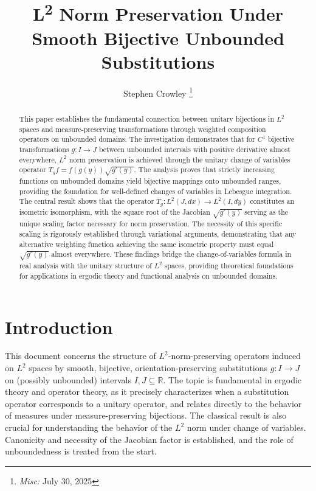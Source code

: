 \documentclass{article}
\newcommand{\tmmisc}[1]{\thanks{\textit{Misc:} #1}}
\newcommand{\tmrsup}[1]{\textsuperscript{#1}}
\begin{document}
\title{L\tmrsup{2} Norm Preservation Under Smooth Bijective Unbounded
Substitutions}

\author{
  Stephen Crowley
  \tmmisc{July 30, 2025}
}

\date{}

\maketitle

\begin{abstract}
  This paper establishes the fundamental connection between unitary bijections
  in $L^2$ spaces and measure-preserving transformations through weighted
  composition operators on unbounded domains. The investigation demonstrates
  that for $C^1$ bijective transformations $g : I \to J$ between unbounded
  intervals with positive derivative almost everywhere, $L^2$ norm
  preservation is achieved through the unitary change of variables operator
  $T_g f = f (g (y)) \sqrt{g' (y)}$. The analysis proves that strictly
  increasing functions on unbounded domains yield bijective mappings onto
  unbounded ranges, providing the foundation for well-defined changes of
  variables in Lebesgue integration. The central result shows that the
  operator $T_g : L^2 (J, dx) \to L^2 (I, dy)$ constitutes an isometric
  isomorphism, with the square root of the Jacobian $\sqrt{g' (y)}$ serving as
  the unique scaling factor necessary for norm preservation. The necessity of
  this specific scaling is rigorously established through variational
  arguments, demonstrating that any alternative weighting function achieving
  the same isometric property must equal $\sqrt{g' (y)}$ almost everywhere.
  These findings bridge the change-of-variables formula in real analysis with
  the unitary structure of $L^2$ spaces, providing theoretical foundations for
  applications in ergodic theory and functional analysis on unbounded domains.
\end{abstract}

{\tableofcontents}

\section{Introduction}

This document concerns the structure of $L^2$-norm-preserving operators
induced on $L^2$ spaces by smooth, bijective, orientation-preserving
substitutions $g : I \to J$ on (possibly unbounded) intervals $I, J \subseteq
\mathbb{R}$. The topic is fundamental in ergodic theory and operator theory,
as it precisely characterizes when a substitution operator corresponds to a
unitary operator, and relates directly to the behavior of measures under
measure-preserving bijections. The classical result is also crucial for
understanding the behavior of the $L^2$ norm under change of variables.
Canonicity and necessity of the Jacobian factor is established, and the role
of unboundedness is treated from the start.
\end{document}
